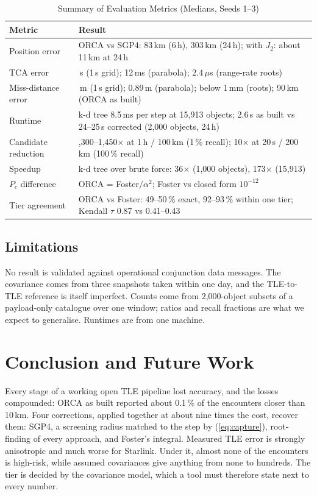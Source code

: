\documentclass[conference]{IEEEtran}
\begin{document}
\begin{table}[t]
\caption{Summary of Evaluation Metrics (Medians, Seeds 1--3)}
\label{tab:metrics}
\centering
\footnotesize
\begin{tabular}{|>{\raggedright\arraybackslash}p{2.1cm}|>{\raggedright\arraybackslash}p{5.5cm}|}
\hline
\textbf{Metric} & \textbf{Result}\\
\hline
Position error & ORCA vs SGP4: 83\,km (6\,h), 303\,km (24\,h); with $J_2$: about 11\,km at 24\,h\\
\hline
TCA error & 0.25\,s (1\,s grid); 12\,ms (parabola); 2.4\,$\mu$s (range-rate roots)\\
\hline
Miss-distance error & 371\,m (1\,s grid); 0.89\,m (parabola); below 1\,mm (roots); 90\,km (ORCA as built)\\
\hline
Runtime & k-d tree 8.5\,ms per step at 15,913 objects; 2.6\,s as built vs 24--25\,s corrected (2,000 objects, 24\,h)\\
\hline
Candidate reduction & 1,300--1,450$\times$ at 1\,h / 100\,km (1\,\% recall); 10$\times$ at 20\,s / 200\,km (100\,\% recall)\\
\hline
Speedup & k-d tree over brute force: 36$\times$ (1,000 objects), 173$\times$ (15,913)\\
\hline
$P_c$ difference & ORCA = Foster$/\alpha^2$; Foster vs closed form $10^{-12}$\\
\hline
Tier agreement & ORCA vs Foster: 49--50\,\% exact, 92--93\,\% within one tier; Kendall $\tau$ 0.87 vs 0.41--0.43\\
\hline
\end{tabular}
\end{table}

\subsection{Limitations}
No result is validated against operational conjunction data messages. The covariance comes from three snapshots taken within one day, and the TLE-to-TLE reference is itself imperfect. Counts come from 2,000-object subsets of a payload-only catalogue over one window; ratios and recall fractions are what we expect to generalise. Runtimes are from one machine.

\section{Conclusion and Future Work}
Every stage of a working open TLE pipeline lost accuracy, and the losses compounded: ORCA as built reported about 0.1\,\% of the encounters closer than 10\,km. Four corrections, applied together at about nine times the cost, recover them: SGP4, a screening radius matched to the step by (\ref{eq:capture}), root-finding of every approach, and Foster's integral. Measured TLE error is strongly anisotropic and much worse for Starlink. Under it, almost none of the encounters is high-risk, while assumed covariances give anything from none to hundreds. The tier is decided by the covariance model, which a tool must therefore state next to every number.
\end{document}
